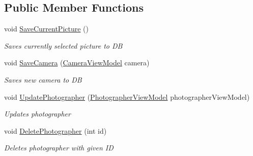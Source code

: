 \subsection*{Public Member Functions}
\begin{DoxyCompactItemize}
\item 
void \mbox{\hyperlink{class_pic_d_b_1_1_models_1_1_main_window_view_model_a26057716e3ae949d1dba2b06fec43084}{Save\+Current\+Picture}} ()
\begin{DoxyCompactList}\small\item\em Saves currently selected picture to DB \end{DoxyCompactList}\item 
void \mbox{\hyperlink{class_pic_d_b_1_1_models_1_1_main_window_view_model_a3e125c01a5e2f94e28aad721acbd7f70}{Save\+Camera}} (\mbox{\hyperlink{class_pic_d_b_1_1_view_models_1_1_camera_view_model}{Camera\+View\+Model}} camera)
\begin{DoxyCompactList}\small\item\em Saves new camera to DB \end{DoxyCompactList}\item 
void \mbox{\hyperlink{class_pic_d_b_1_1_models_1_1_main_window_view_model_a285095e362a804d32af8cc4a5eb55219}{Update\+Photographer}} (\mbox{\hyperlink{class_pic_d_b_1_1_models_1_1_photographer_view_model}{Photographer\+View\+Model}} photographer\+View\+Model)
\begin{DoxyCompactList}\small\item\em Updates photographer \end{DoxyCompactList}\item 
void \mbox{\hyperlink{class_pic_d_b_1_1_models_1_1_main_window_view_model_afe4f8464f8816c04ec3a2480f2de7339}{Delete\+Photographer}} (int id)
\begin{DoxyCompactList}\small\item\em Deletes photographer with given ID \end{DoxyCompactList}\end{DoxyCompactItemize}
